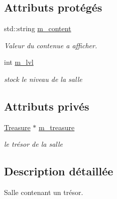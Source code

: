 \subsection*{Attributs protégés}
\begin{DoxyCompactItemize}
\item 
\hypertarget{class_room_comportement_a48186371372d14465faffc7734e89fdc}{std\-::string \hyperlink{class_room_comportement_a48186371372d14465faffc7734e89fdc}{m\-\_\-content}}\label{class_room_comportement_a48186371372d14465faffc7734e89fdc}

\begin{DoxyCompactList}\small\item\em Valeur du contenue a afficher. \end{DoxyCompactList}\item 
\hypertarget{class_room_comportement_acfc0d0c3c7dbcd88235e8c615f7290a3}{int \hyperlink{class_room_comportement_acfc0d0c3c7dbcd88235e8c615f7290a3}{m\-\_\-lvl}}\label{class_room_comportement_acfc0d0c3c7dbcd88235e8c615f7290a3}

\begin{DoxyCompactList}\small\item\em stock le niveau de la salle \end{DoxyCompactList}\end{DoxyCompactItemize}
\subsection*{Attributs privés}
\begin{DoxyCompactItemize}
\item 
\hypertarget{class_treasure_room_a60623664a3a1bac1d3a0431269dc740b}{\hyperlink{class_treasure}{Treasure} $\ast$ \hyperlink{class_treasure_room_a60623664a3a1bac1d3a0431269dc740b}{m\-\_\-treasure}}\label{class_treasure_room_a60623664a3a1bac1d3a0431269dc740b}

\begin{DoxyCompactList}\small\item\em le trésor de la salle \end{DoxyCompactList}\end{DoxyCompactItemize}


\subsection{Description détaillée}
Salle contenant un trésor. 

